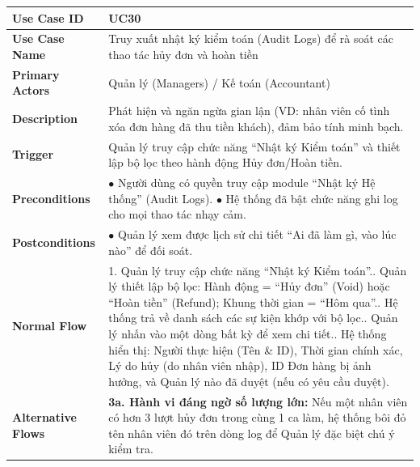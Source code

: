 \begin{longtable}{|p{3.5cm}|p{12.5cm}|}
\hline
\textbf{Use Case ID} & UC30 \\ \hline
\textbf{Use Case Name} & Truy xuất nhật ký kiểm toán (Audit Logs) để rà soát các thao tác hủy đơn và hoàn tiền \\ \hline
\textbf{Primary Actors} & Quản lý (Managers) / Kế toán (Accountant) \\ \hline
\textbf{Description} & Phát hiện và ngăn ngừa gian lận (VD: nhân viên cố tình xóa đơn hàng đã thu tiền khách), đảm bảo tính minh bạch. \\ \hline
\textbf{Trigger} & Quản lý truy cập chức năng ``Nhật ký Kiểm toán'' và thiết lập bộ lọc theo hành động Hủy đơn/Hoàn tiền. \\ \hline
\textbf{Preconditions} &
$\bullet$ Người dùng có quyền truy cập module ``Nhật ký Hệ thống'' (Audit Logs).\newline
$\bullet$ Hệ thống đã bật chức năng ghi log cho mọi thao tác nhạy cảm. \\ \hline
\textbf{Postconditions} & $\bullet$ Quản lý xem được lịch sử chi tiết ``Ai đã làm gì, vào lúc nào'' để đối soát. \\ \hline
\textbf{Normal Flow} &
1. Quản lý truy cập chức năng ``Nhật ký Kiểm toán''.\newline
2. Quản lý thiết lập bộ lọc: Hành động = ``Hủy đơn'' (Void) hoặc ``Hoàn tiền'' (Refund); Khung thời gian = ``Hôm qua''.\newline
3. Hệ thống trả về danh sách các sự kiện khớp với bộ lọc.\newline
4. Quản lý nhấn vào một dòng bất kỳ để xem chi tiết.\newline
5. Hệ thống hiển thị: Người thực hiện (Tên \& ID), Thời gian chính xác, Lý do hủy (do nhân viên nhập), ID Đơn hàng bị ảnh hưởng, và Quản lý nào đã duyệt (nếu có yêu cầu duyệt). \\ \hline
\textbf{Alternative Flows} &
\textbf{3a. Hành vi đáng ngờ số lượng lớn:} Nếu một nhân viên có hơn 3 lượt hủy đơn trong cùng 1 ca làm, hệ thống bôi đỏ tên nhân viên đó trên dòng log để Quản lý đặc biệt chú ý kiểm tra. \\ \hline
\end{longtable}

